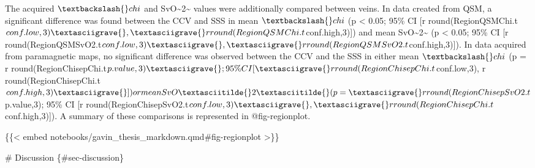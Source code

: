 \documentclass[
  letterpaper,
  DIV=11,
  numbers=noendperiod]{scrartcl}
\newenvironment{Shaded}{\begin{snugshade}}{\end{snugshade}}
\newcommand{\NormalTok}[1]{\textcolor[rgb]{0.00,0.23,0.31}{#1}}
\begin{document}
\begin{Shaded}
\begin{Highlighting}[]
\NormalTok{The acquired $\textbackslash{}chi$ and SvO\textasciitilde{}2\textasciitilde{} values were additionally compared between veins. In data created from QSM, a significant difference was found between the CCV and SSS in mean $\textbackslash{}chi$ (p \textless{} 0.05; 95\% CI [\textasciigrave{}r round(RegionQSMChi.t$conf.low,3)\textasciigrave{}, \textasciigrave{}r round(RegionQSMChi.t$conf.high,3)\textasciigrave{}]) and mean SvO\textasciitilde{}2\textasciitilde{} (p \textless{} 0.05; 95\% CI [\textasciigrave{}r round(RegionQSMSvO2.t$conf.low,3)\textasciigrave{}, \textasciigrave{}r round(RegionQSMSvO2.t$conf.high,3)\textasciigrave{}]). In data acquired from paramagnetic maps, no significant difference was observed between the CCV and the SSS in either mean $\textbackslash{}chi$ (p = \textasciigrave{}r round(RegionChisepChi.t$p.value,3)\textasciigrave{}; 95\% CI [\textasciigrave{}r round(RegionChisepChi.t$conf.low,3)\textasciigrave{}, \textasciigrave{}r round(RegionChisepChi.t$conf.high,3)\textasciigrave{}]) or mean SvO\textasciitilde{}2\textasciitilde{} (p = \textasciigrave{}r round(RegionChisepSvO2.t$p.value,3)\textasciigrave{}; 95\% CI [\textasciigrave{}r round(RegionChisepSvO2.t$conf.low,3)\textasciigrave{}, \textasciigrave{}r round(RegionChisepChi.t$conf.high,3)\textasciigrave{}]). A summary of these comparisons is represented in @fig{-}regionplot.}

\NormalTok{\{\{\textless{} embed notebooks/gavin\_thesis\_markdown.qmd\#fig{-}regionplot \textgreater{}\}\}}

\NormalTok{\# Discussion \{\#sec{-}discussion\}}


\end{Highlighting}
\end{Shaded}
\end{document}
